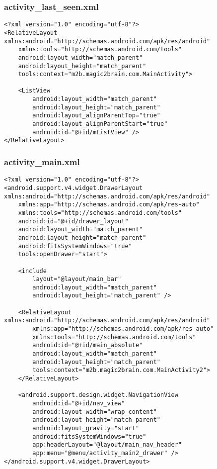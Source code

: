 \subsubsection*{activity\_last\_seen.xml}
\begin{lstlisting}
<?xml version="1.0" encoding="utf-8"?>
<RelativeLayout xmlns:android="http://schemas.android.com/apk/res/android"
    xmlns:tools="http://schemas.android.com/tools"
    android:layout_width="match_parent"
    android:layout_height="match_parent"
    tools:context="m2b.magic2brain.com.MainActivity">

    <ListView
        android:layout_width="match_parent"
        android:layout_height="match_parent"
        android:layout_alignParentTop="true"
        android:layout_alignParentStart="true"
        android:id="@+id/mListView" />
</RelativeLayout>
\end{lstlisting}

\subsubsection*{activity\_main.xml}
\begin{lstlisting}
<?xml version="1.0" encoding="utf-8"?>
<android.support.v4.widget.DrawerLayout xmlns:android="http://schemas.android.com/apk/res/android"
    xmlns:app="http://schemas.android.com/apk/res-auto"
    xmlns:tools="http://schemas.android.com/tools"
    android:id="@+id/drawer_layout"
    android:layout_width="match_parent"
    android:layout_height="match_parent"
    android:fitsSystemWindows="true"
    tools:openDrawer="start">

    <include
        layout="@layout/main_bar"
        android:layout_width="match_parent"
        android:layout_height="match_parent" />

    <RelativeLayout xmlns:android="http://schemas.android.com/apk/res/android"
        xmlns:app="http://schemas.android.com/apk/res-auto"
        xmlns:tools="http://schemas.android.com/tools"
        android:id="@+id/main_absolute"
        android:layout_width="match_parent"
        android:layout_height="match_parent"
        tools:context="m2b.magic2brain.com.MainActivity2">
    </RelativeLayout>

    <android.support.design.widget.NavigationView
        android:id="@+id/nav_view"
        android:layout_width="wrap_content"
        android:layout_height="match_parent"
        android:layout_gravity="start"
        android:fitsSystemWindows="true"
        app:headerLayout="@layout/main_nav_header"
        app:menu="@menu/activity_main2_drawer" />
</android.support.v4.widget.DrawerLayout>
\end{lstlisting}

